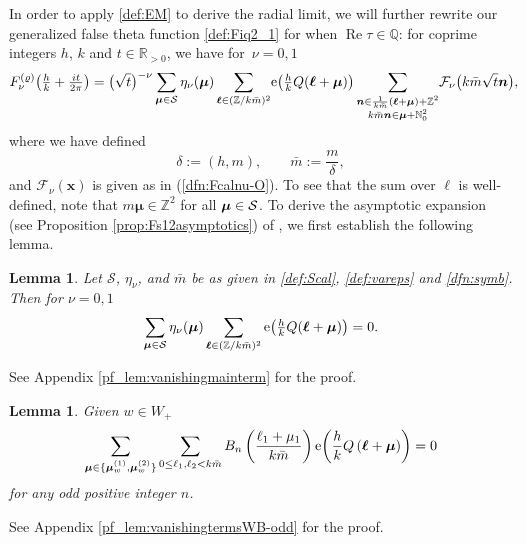 \documentclass[pdftex]{sigma}
\def\BZ{\mathbb{Z}}
\def\CF{\mathcal{F}}
\def\CS{\mathcal{S}}
\newcommand{\RR}{\mathbb{R}}
\newcommand{\QQ}{\mathbb{Q}}
\newcommand{\ZZ}{\mathbb{Z}}
\def\bos{\varrho}
\def\bmu{\boldsymbol{\mu}}
\def\bol{\boldsymbol{\ell}}
\def\ex{{\rm e}}
\newtheorem{lem}[thm]{Lemma}
\theoremstyle{definition}
\numberwithin{equation}{section}
\begin{document}
In order to apply \eqref{def:EM} to derive the radial limit, we will further rewrite our generalized false theta function \eqref{def:Fiq2_1} for when $\operatorname{Re}\tau \in \QQ$: for coprime integers $h$, $k$ and $t\in \RR_{>0}$, we have for~$\nu=0,1$
\begin{gather}
	F_\nu^{(\bos)}\bigl(\tfrac{h}{k} +\tfrac{it}{2\pi}\bigr) = \bigl(\sqrt{t}\bigr)^{-\nu} \sum_{\boldsymbol{\mu} \in \CS} \eta_\nu(\boldsymbol{\mu})
	\sum_{ \boldsymbol{\ell}\in (\ZZ/k\bar m)^2 } \! \ex\bigl(\tfrac{h}{k}Q(\bol+\bmu)\bigr)
 	\sum_{\substack{\boldsymbol{n} \in \frac{1}{k\bar m}(\boldsymbol{\ell} +\boldsymbol{\mu} ) + \mathbb{Z}^2\\ k\bar m \boldsymbol{n} \in \bmu + {\mathbb N}_0^2}}\!
	\CF_\nu \bigl( k\bar m \sqrt{t} \boldsymbol{n} \bigr),\!\!\!\label{F112new}
\end{gather}
where we have defined
\begin{equation}\label{dfn:symb}
	\delta:=(h,m),\qquad\bar m:= \frac{m}{ \delta},
\end{equation}
and $\CF_\nu(\boldsymbol{x})$ is given as in (\ref{dfn:Fcalnu-O}).
To see that the sum over $\bol$ is well-defined, note that $m \bmu \in \BZ^2$ for all $\bmu \in {\cal S}$. To derive the asymptotic expansion (see Proposition \ref{prop:Fs12asymptotics}) of \smash{$F_\nu^{(\bos)}$}, we first establish the following lemma.
\begin{lem}
	\label{lem:vanishingmainterm}
	Let $\CS$, $\eta_\nu$, and $\bar m$ be as given in \eqref{def:Scal},
	\eqref{def:vareps} and \eqref{dfn:symb}.
	Then for $\nu=0,1$
	\begin{gather*}%
		\sum_{\bmu\in\CS}\eta_\nu(\bmu)\sum_{\boldsymbol{\ell}\in (\ZZ/k\bar m)^2 }\ex\bigl(\tfrac{h}{k}Q(\bol+\bmu)\bigr) =0.
	\end{gather*}
\end{lem}

See Appendix \ref{pf_lem:vanishingmainterm} for the proof.

{\samepage\begin{lem}
	\label{lem:vanishingtermsWB-odd}
	Given $w\in W_+$
	\begin{equation*}
		\sum_{\bmu\in \{ \bmu_w^{(1)},\bmu_w^{(2)} \}}\sum_{0\leq \ell_1,\ell_2 < k\bar m} B_n\left( \frac{\ell_{1}+\mu_{1}}{k\bar{m}} \right)\ex{\left(\frac{h}{k}Q\left( \bol+\bmu \right)\right)}=0
	\end{equation*}
for any odd positive integer $n$.
\end{lem}

See Appendix \ref{pf_lem:vanishingtermsWB-odd} for the proof.}
\end{document}
